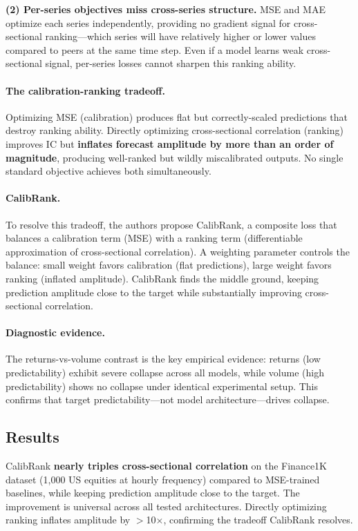 \documentclass[11pt,a4paper]{article}
\begin{document}
\textbf{(2) Per-series objectives miss cross-series structure.} MSE and MAE optimize each series independently, providing no gradient signal for cross-sectional ranking---which series will have relatively higher or lower values compared to peers at the same time step. Even if a model learns weak cross-sectional signal, per-series losses cannot sharpen this ranking ability.

\paragraph{The calibration-ranking tradeoff.} Optimizing MSE (calibration) produces flat but correctly-scaled predictions that destroy ranking ability. Directly optimizing cross-sectional correlation (ranking) improves IC but \textbf{inflates forecast amplitude by more than an order of magnitude}, producing well-ranked but wildly miscalibrated outputs. No single standard objective achieves both simultaneously.

\paragraph{CalibRank.} To resolve this tradeoff, the authors propose CalibRank, a composite loss that balances a calibration term (MSE) with a ranking term (differentiable approximation of cross-sectional correlation). A weighting parameter controls the balance: small weight favors calibration (flat predictions), large weight favors ranking (inflated amplitude). CalibRank finds the middle ground, keeping prediction amplitude close to the target while substantially improving cross-sectional correlation.

\paragraph{Diagnostic evidence.} The returns-vs-volume contrast is the key empirical evidence: returns (low predictability) exhibit severe collapse across all models, while volume (high predictability) shows no collapse under identical experimental setup. This confirms that target predictability---not model architecture---drives collapse.

\subsection{Results}

CalibRank \textbf{nearly triples cross-sectional correlation} on the Finance1K dataset (1,000 US equities at hourly frequency) compared to MSE-trained baselines, while keeping prediction amplitude close to the target. The improvement is universal across all tested architectures. Directly optimizing ranking inflates amplitude by $>$10$\times$, confirming the tradeoff CalibRank resolves.
\end{document}

